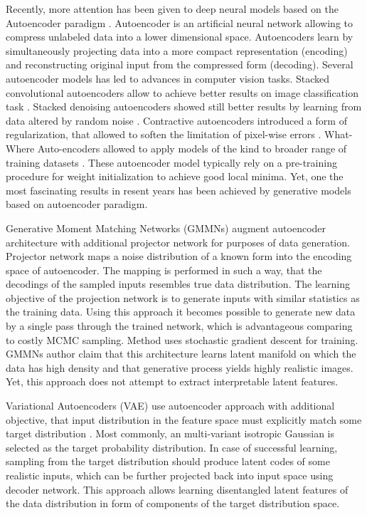 Recently, more attention has been given to deep neural models based on the Autoencoder paradigm \cite{Hinton2006}.
Autoencoder is an artificial neural network allowing to compress unlabeled data into a lower dimensional space.
Autoencoders learn by simultaneously projecting data into a more compact representation (encoding) and reconstructing original input from the compressed form (decoding).
Several autoencoder models has led to advances in computer vision tasks.
Stacked convolutional autoencoders allow to achieve better results on image classification task \cite{Masci2011}.
Stacked denoising autoencoders showed still better results by learning from data altered by random noise  \cite{Vincent2010}.
Contractive autoencoders introduced a form of regularization, that allowed to soften the limitation of pixel-wise errors \cite{Rifai2011}.
What-Where Auto-encoders allowed to apply models of the kind to broader range of training datasets \cite{Zhao2015}.
These autoencoder model typically rely on a pre-training procedure for weight initialization to achieve good local minima.
Yet, one the most fascinating results in resent years has been achieved by generative models based on autoencoder paradigm.

Generative Moment Matching Networks (GMMNs) \cite{Li2015, Ren2016} augment autoencoder architecture with additional projector network for purposes of data generation.
Projector network maps a noise distribution of a known form into the encoding space of autoencoder. The mapping is performed in such a way, that the decodings of the sampled inputs resembles true data distribution.
The learning objective of the projection network is to generate inputs with similar statistics as the training data.
Using this approach it becomes possible to generate new data by a single pass through the trained network, which is advantageous comparing to costly MCMC sampling.
Method uses stochastic gradient descent for training.
GMMNs author claim that this architecture learns latent manifold on which the data has high density and that generative process yields highly realistic images.
Yet, this approach does not attempt to extract interpretable latent features.

Variational Autoencoders (VAE) use autoencoder approach with additional objective, that input distribution in the feature space must explicitly match some target distribution \cite{Kingma2013, Doersch2016}.
Most commonly, an multi-variant isotropic Gaussian is selected as the target probability distribution.
In case of successful learning, sampling from the target distribution should produce latent codes of some realistic inputs, which can be further projected back into input space using decoder network.
This approach allows learning disentangled latent features of the data distribution in form of components of the target distribution space.

